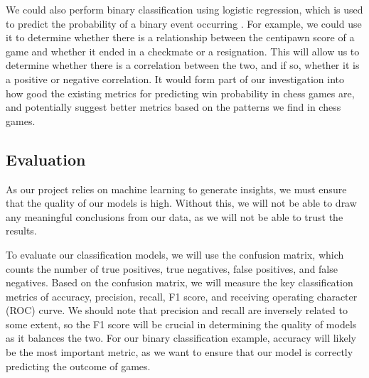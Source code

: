 \documentclass[%
 superscriptaddress,
showpacs,preprintnumbers,
 amsmath,
 amssymb,
 aps,
 pra,
showkeys,
onecolumn,
notitlepage,
11pt,
tightenlines      %
]{revtex4-1}
\begin{document}
We could also perform binary classification using logistic regression, which is used to predict the probability of a binary event occurring \cite{peng2002introduction}. For example, we could use it to determine whether there is a relationship between the centipawn score of a game and whether it ended in a checkmate or a resignation. This will allow us to determine whether there is a correlation between the two, and if so, whether it is a positive or negative correlation. It would form part of our investigation into how good the existing metrics for predicting win probability in chess games are, and potentially suggest better metrics based on the patterns we find in chess games.

\subsection{Evaluation}
As our project relies on machine learning to generate insights, we must ensure that the quality of our models is high. Without this, we will not be able to draw any meaningful conclusions from our data, as we will not be able to trust the results.

To evaluate our classification models, we will use the confusion matrix, which counts the number of true positives, true negatives, false positives, and false negatives. Based on the confusion matrix, we will measure the key classification metrics of accuracy, precision, recall, F1 score, and receiving operating character (ROC) curve. We should note that precision and recall are inversely related to some extent, so the F1 score will be crucial in determining the quality of models as it balances the two. For our binary classification example, accuracy will likely be the most important metric, as we want to ensure that our model is correctly predicting the outcome of games.

    
    
\end{document}
